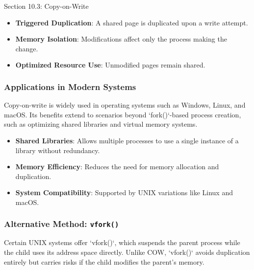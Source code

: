 \begin{notes}{Section 10.3: Copy-on-Write}
    \begin{highlight}
    
    \begin{itemize}
        \item \textbf{Triggered Duplication}: A shared page is duplicated upon a write attempt.
        \item \textbf{Memory Isolation}: Modifications affect only the process making the change.
        \item \textbf{Optimized Resource Use}: Unmodified pages remain shared.
    \end{itemize}
    
    \end{highlight}
    
    \subsubsection*{Applications in Modern Systems}
    
    Copy-on-write is widely used in operating systems such as Windows, Linux, and macOS. Its benefits extend to scenarios beyond `fork()`-based process creation, such as optimizing shared libraries and 
    virtual memory systems.
    
    \begin{highlight}
    
    \begin{itemize}
        \item \textbf{Shared Libraries}: Allows multiple processes to use a single instance of a library without redundancy.
        \item \textbf{Memory Efficiency}: Reduces the need for memory allocation and duplication.
        \item \textbf{System Compatibility}: Supported by UNIX variations like Linux and macOS.
    \end{itemize}
    
    \end{highlight}
    
    \subsubsection*{Alternative Method: \texttt{vfork()}}
    
    Certain UNIX systems offer `vfork()`, which suspends the parent process while the child uses its address space directly. Unlike COW, `vfork()` avoids duplication entirely but carries risks if the 
    child modifies the parent's memory.
    

\end{notes}
